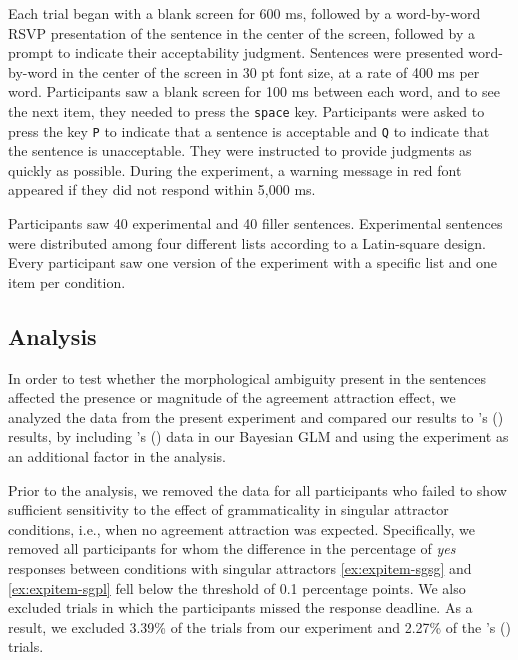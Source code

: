 \documentclass[]{interact}\usepackage[]{graphicx}\usepackage[]{color}
\theoremstyle{plain}%
\theoremstyle{definition}
\theoremstyle{remark}
\newcommand{\rev}[1]{{\color{red}#1}}
\begin{document}
Each trial began with a blank screen for 600 ms, followed by a word-by-word RSVP presentation of the sentence in the center of the screen, followed by a prompt to indicate their acceptability judgment. Sentences were presented word-by-word in the center of the screen in 30 pt font size, at a rate of 400 ms per word. Participants saw a blank screen for 100 ms between each word, and to see the next item, they needed to press the \texttt{space} key. Participants were asked to press the key \texttt{P} to indicate that a sentence is acceptable and \texttt{Q} to indicate that the sentence is unacceptable. They were instructed to provide judgments as quickly as possible. During the experiment, a warning message in red font appeared if they did not respond within 5,000 ms.

Participants saw 40 experimental and 40 filler sentences. Experimental sentences were distributed among four different lists according to a Latin-square design. Every participant saw one version of the experiment with a specific list and one item per condition.

\subsection{Analysis}

In order to test whether the morphological ambiguity present in the \citet{LagoEtAl:2019} sentences affected the presence or magnitude of the agreement attraction effect, we analyzed the data from the present experiment \rev{and} compared our results to \citeauthor{LagoEtAl:2019}'s (\citeyear{LagoEtAl:2019}) results, by including \citeauthor{LagoEtAl:2019}'s (\citeyear{LagoEtAl:2019}) data in our Bayesian GLM and using the experiment as an additional factor in the analysis.
  
Prior to the analysis, we removed the data for all participants who failed to show sufficient sensitivity to the effect of grammaticality in singular attractor conditions, i.e., when no agreement attraction was expected. Specifically, we removed all participants for whom the difference in the percentage of \textit{yes} responses between \rev{conditions with singular attractors \ref{ex:expitem-sgsg} and \ref{ex:expitem-sgpl}} fell below the threshold of 0.1 percentage points. We also excluded trials in which the participants missed the response deadline. As a result, we excluded \rev{3.39\%} of the trials from our experiment and 2.27\% of the \citeauthor{LagoEtAl:2019}'s (\citeyear{LagoEtAl:2019}) trials. 
\end{document}
